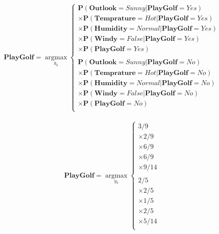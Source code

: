 \documentclass[11pt, a4paper]{article}
\begin{document}
\begin{align*}
	\mathbf{PlayGolf} = \operatorname*{argmax}_{y_k}\left\{
	\begin{array}{ll}
	\mathbf{P}(\textbf{Outlook}=Sunny|\textbf{PlayGolf}=Yes)         \\
	\times\mathbf{P}(\textbf{Temprature}=Hot|\textbf{PlayGolf}=Yes)  \\
	\times\mathbf{P}(\textbf{Humidity}=Normal|\textbf{PlayGolf}=Yes) \\
	\times\mathbf{P}(\textbf{Windy}=False|\textbf{PlayGolf}=Yes)     \\
	\times\mathbf{P}(\textbf{PlayGolf}=Yes)                          \\
	                                                                 \\
	\mathbf{P}(\textbf{Outlook}=Sunny|\textbf{PlayGolf}=No)          \\
	\times\mathbf{P}(\textbf{Temprature}=Hot|\textbf{PlayGolf}=No)   \\
	\times\mathbf{P}(\textbf{Humidity}=Normal|\textbf{PlayGolf}=No)  \\
	\times\mathbf{P}(\textbf{Windy}=False|\textbf{PlayGolf}=No)      \\
	\times\mathbf{P}(\textbf{PlayGolf}=No)                           \\
	\end{array}
	\right.
\end{align*}

\begin{align*}
	\mathbf{PlayGolf} = \operatorname*{argmax}_{y_k}\left\{
	\begin{array}{ll}
	3/9                                                     \\
	\times2/9                                               \\
	\times6/9                                               \\
	\times6/9                                               \\
	\times9/14                                              \\
	                                                        \\
	2/5                                                     \\
	\times2/5                                               \\
	\times1/5                                               \\
	\times2/5                                               \\
	\times5/14                                              \\
	\end{array}
	\right.
\end{align*}
\end{document}

